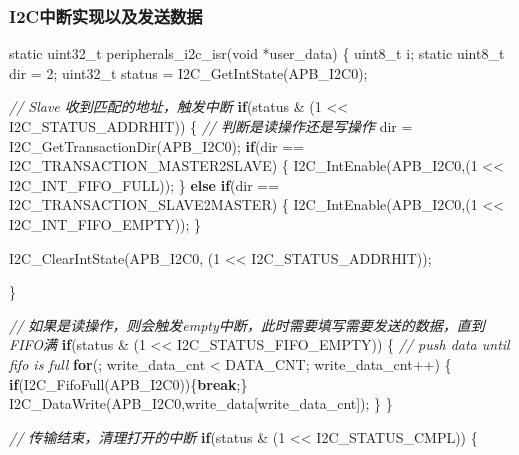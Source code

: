 \documentclass[
  12pt,
]{book}
\newenvironment{Shaded}{\begin{snugshade}}{\end{snugshade}}
\newcommand{\CommentTok}[1]{\textcolor[rgb]{0.56,0.35,0.01}{\textit{#1}}}
\newcommand{\ControlFlowTok}[1]{\textcolor[rgb]{0.13,0.29,0.53}{\textbf{#1}}}
\newcommand{\DataTypeTok}[1]{\textcolor[rgb]{0.13,0.29,0.53}{#1}}
\newcommand{\DecValTok}[1]{\textcolor[rgb]{0.00,0.00,0.81}{#1}}
\newcommand{\NormalTok}[1]{#1}
\begin{document}
\hypertarget{i2cux4e2dux65adux5b9eux73b0ux4ee5ux53caux53d1ux9001ux6570ux636e}{%
\subsubsection{I2C中断实现以及发送数据}\label{i2cux4e2dux65adux5b9eux73b0ux4ee5ux53caux53d1ux9001ux6570ux636e}}

\begin{Shaded}
\begin{Highlighting}[]
\DataTypeTok{static} \DataTypeTok{uint32_t}\NormalTok{ peripherals_i2c_isr(}\DataTypeTok{void}\NormalTok{ *user_data)}
\NormalTok{\{}
  \DataTypeTok{uint8_t}\NormalTok{ i;}
  \DataTypeTok{static} \DataTypeTok{uint8_t}\NormalTok{ dir = }\DecValTok{2}\NormalTok{;}
  \DataTypeTok{uint32_t}\NormalTok{ status = I2C_GetIntState(APB_I2C0);}

  \CommentTok{// Slave 收到匹配的地址，触发中断}
  \ControlFlowTok{if}\NormalTok{(status & (}\DecValTok{1}\NormalTok{ << I2C_STATUS_ADDRHIT))}
\NormalTok{  \{}
    \CommentTok{// 判断是读操作还是写操作}
\NormalTok{    dir = I2C_GetTransactionDir(APB_I2C0);}
    \ControlFlowTok{if}\NormalTok{(dir == I2C_TRANSACTION_MASTER2SLAVE)}
\NormalTok{    \{}
\NormalTok{        I2C_IntEnable(APB_I2C0,(}\DecValTok{1}\NormalTok{ << I2C_INT_FIFO_FULL));}
\NormalTok{    \}}
    \ControlFlowTok{else} \ControlFlowTok{if}\NormalTok{(dir == I2C_TRANSACTION_SLAVE2MASTER)}
\NormalTok{    \{}
\NormalTok{        I2C_IntEnable(APB_I2C0,(}\DecValTok{1}\NormalTok{ << I2C_INT_FIFO_EMPTY));}
\NormalTok{    \}}

\NormalTok{    I2C_ClearIntState(APB_I2C0, (}\DecValTok{1}\NormalTok{ << I2C_STATUS_ADDRHIT));}

\NormalTok{  \}}
  
  \CommentTok{// 如果是读操作，则会触发empty中断，此时需要填写需要发送的数据，直到FIFO满}
  \ControlFlowTok{if}\NormalTok{(status & (}\DecValTok{1}\NormalTok{ << I2C_STATUS_FIFO_EMPTY))}
\NormalTok{  \{}
    \CommentTok{// push data until fifo is full}
    \ControlFlowTok{for}\NormalTok{(; write_data_cnt < DATA_CNT; write_data_cnt++)}
\NormalTok{    \{}
      \ControlFlowTok{if}\NormalTok{(I2C_FifoFull(APB_I2C0))\{}\ControlFlowTok{break}\NormalTok{;\}}
\NormalTok{      I2C_DataWrite(APB_I2C0,write_data[write_data_cnt]);}
\NormalTok{    \}}
\NormalTok{  \}}
  
  \CommentTok{// 传输结束，清理打开的中断}
  \ControlFlowTok{if}\NormalTok{(status & (}\DecValTok{1}\NormalTok{ << I2C_STATUS_CMPL))}
\NormalTok{  \{}
    

\end{Highlighting}
\end{Shaded}
\end{document}
